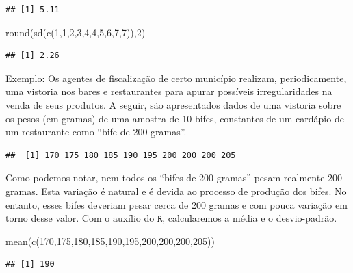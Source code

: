 \documentclass[
]{book}
\newenvironment{Shaded}{\begin{snugshade}}{\end{snugshade}}
\newcommand{\DecValTok}[1]{\textcolor[rgb]{0.00,0.00,0.81}{#1}}
\newcommand{\FunctionTok}[1]{\textcolor[rgb]{0.00,0.00,0.00}{#1}}
\newcommand{\NormalTok}[1]{#1}
\begin{document}
\begin{verbatim}
## [1] 5.11
\end{verbatim}

\begin{Shaded}
\begin{Highlighting}[]
\FunctionTok{round}\NormalTok{(}\FunctionTok{sd}\NormalTok{(}\FunctionTok{c}\NormalTok{(}\DecValTok{1}\NormalTok{,}\DecValTok{1}\NormalTok{,}\DecValTok{2}\NormalTok{,}\DecValTok{3}\NormalTok{,}\DecValTok{4}\NormalTok{,}\DecValTok{4}\NormalTok{,}\DecValTok{5}\NormalTok{,}\DecValTok{6}\NormalTok{,}\DecValTok{7}\NormalTok{,}\DecValTok{7}\NormalTok{)),}\DecValTok{2}\NormalTok{)}
\end{Highlighting}
\end{Shaded}

\begin{verbatim}
## [1] 2.26
\end{verbatim}

Exemplo: Os agentes de fiscalização de certo município realizam, periodicamente, uma vistoria nos bares e restaurantes para apurar possíveis irregularidades na venda de seus produtos. A seguir, são apresentados dados de uma vistoria sobre os pesos (em gramas) de uma amostra de 10 bifes, constantes de um cardápio de um restaurante como ``bife de 200 gramas''.

\begin{verbatim}
##  [1] 170 175 180 185 190 195 200 200 200 205
\end{verbatim}

Como podemos notar, nem todos os ``bifes de 200 gramas'' pesam realmente 200 gramas. Esta variação é natural e é devida ao processo de produção dos bifes. No entanto, esses bifes deveriam pesar cerca de 200 gramas e com pouca variação em torno desse valor. Com o auxílio do \(\texttt{R}\), calcularemos a média e o desvio-padrão.

\begin{Shaded}
\begin{Highlighting}[]
\FunctionTok{mean}\NormalTok{(}\FunctionTok{c}\NormalTok{(}\DecValTok{170}\NormalTok{,}\DecValTok{175}\NormalTok{,}\DecValTok{180}\NormalTok{,}\DecValTok{185}\NormalTok{,}\DecValTok{190}\NormalTok{,}\DecValTok{195}\NormalTok{,}\DecValTok{200}\NormalTok{,}\DecValTok{200}\NormalTok{,}\DecValTok{200}\NormalTok{,}\DecValTok{205}\NormalTok{))}
\end{Highlighting}
\end{Shaded}

\begin{verbatim}
## [1] 190
\end{verbatim}
\end{document}

